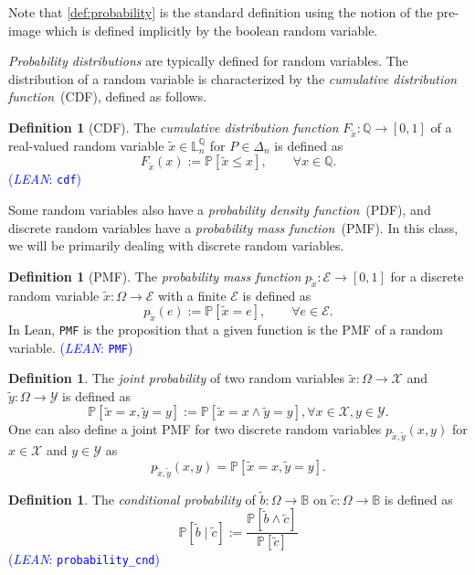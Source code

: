 \documentclass[letterpaper]{article}
\theoremstyle{plain}
\theoremstyle{definition}
\newtheorem{definition}[theorem]{Definition}
\theoremstyle{remark}
\newcommand{\PP}{\mathbb{P}}
\newcommand{\lean}[1]{\textcolor{blue}{(\emph{LEAN}: \texttt{#1})}}
\newcommand{\leanok}{}
\begin{document}
Note that \cref{def:probability} is the standard definition using the notion of the pre-image which is defined implicitly by the boolean random variable. 

\emph{Probability distributions} are typically defined for random variables. The distribution of a random variable is characterized by the \emph{cumulative distribution function}~(CDF), defined as follows.
\begin{definition}[CDF]
  The \emph{cumulative distribution function} $F_{\tilde{x}}\colon \mathbb{Q} \to [0,1]$ of a real-valued random variable $\tilde{x} \in \mathbb{L}_n^{\mathbb{Q}}$ for $P\in \Delta_n$ is defined as
  \[
   F_{\tilde{x}}(x) := \PP\left[\tilde{x} \le x \right], \qquad \forall x\in \mathbb{Q}.
  \]
\lean{cdf} \leanok
\end{definition}

Some random variables also have a \emph{probability density function}~(PDF), and discrete random variables have a \emph{probability mass function}~(PMF). In this class, we will be primarily dealing with discrete random variables.
\begin{definition}[PMF]
The \emph{probability mass function} $p_{\tilde{x}}\colon \mathcal{E} \to [0,1]$ for a discrete random variable $\tilde{x}\colon \Omega  \to  \mathcal{E}$ with a finite $\mathcal{E}$ is defined as
  \[
    p_{\tilde{x}}(e) := \PP\left[\tilde{x} = e\right], \qquad \forall e\in \mathcal{E} .
 \]
In Lean, \texttt{PMF} is the proposition that a given function is the PMF of a random variable.
\lean{PMF} \leanok
\end{definition}


\begin{definition} \label{def:joint-probability}
The \emph{joint probability} of two random variables $\tilde{x}\colon \Omega \to \mathcal{X}$ and $\tilde{y} \colon \Omega \to \mathcal{Y}$ is defined as
\[
 \PP\left[\tilde{x} = x, \tilde{y} = y\right] := \PP\left[\tilde{x} = x \wedge \tilde{y} = y\right] , \forall  x\in \mathcal{X}, y\in \mathcal{Y}.
\]
One can also define a joint PMF for two discrete random variables $p_{\tilde{x}, \tilde{y}}(x,y)$ for $x\in \mathcal{X}$ and $y\in \mathcal{Y}$ as
\[
 p_{\tilde{x}, \tilde{y}}(x,y) = \PP\left[\tilde{x} = x, \tilde{y} = y\right]. 
\]
\end{definition}

\begin{definition} \label{def:probability_cnd}
The \emph{conditional probability} of $\tilde{b}\colon \Omega \to \mathbb{B}$ on $\tilde{c}\colon \Omega \to \mathbb{B}$ is defined as
\[
\PP\left[ \tilde{b} \mid  \tilde{c} \right]  := \frac{ \PP[\tilde{b} \wedge \tilde{c} ] }{ \PP \left[ \tilde{c} \right]}
\]
\lean{probability\_cnd} \leanok
\end{definition}
\end{document}
